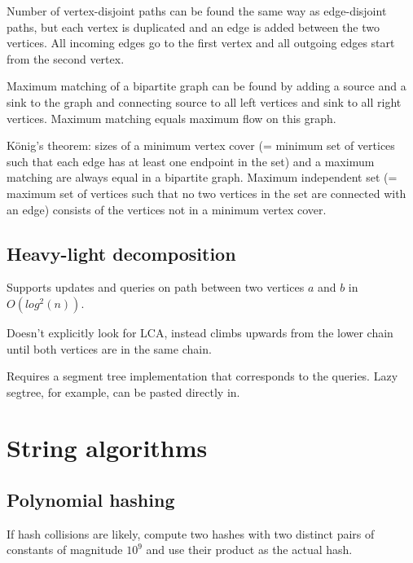 \documentclass{article}
\begin{document}
Number of vertex-disjoint paths can be found the same way as edge-disjoint paths, but each vertex is duplicated and an edge is added between the two vertices. All incoming edges go to the first vertex and all outgoing edges start from the second vertex.

Maximum matching of a bipartite graph can be found by adding a source and a sink to the graph and connecting source to all left vertices and sink to all right vertices. Maximum matching equals maximum flow on this graph.

König's theorem: sizes of a minimum vertex cover (= minimum set of vertices such that each edge has at least one endpoint in the set) and a maximum matching are always equal in a bipartite graph. Maximum independent set (= maximum set of vertices such that no two vertices in the set are connected with an edge) consists of the vertices not in a minimum vertex cover.

\subsection {Heavy-light decomposition}

Supports updates and queries on path between two vertices $a$ and $b$ in $O(log^2(n))$.

Doesn't explicitly look for LCA, instead climbs upwards from the lower chain until both vertices are in the same chain.

Requires a segment tree implementation that corresponds to the queries. Lazy segtree, for example, can be pasted directly in.



\section {String algorithms}

\subsection {Polynomial hashing}

If hash collisions are likely, compute two hashes with two distinct pairs of constants of magnitude $10^9$ and use their product as the actual hash.


\end{document}
